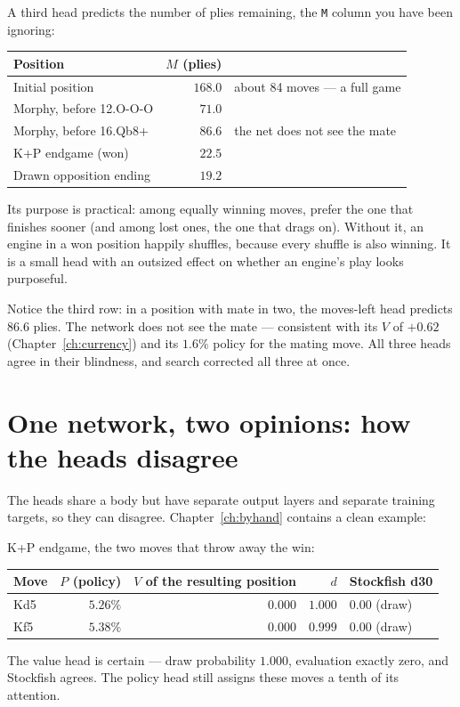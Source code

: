 A third head predicts the number of plies remaining, the \texttt{M} column you have been
ignoring:

\begin{realdata}[title={Real engine output: the moves-left head}]
\begin{center}
\begin{tabular}{@{}lrl@{}}
\toprule
Position & $M$ (plies) & \\
\midrule
Initial position & $168.0$ & about 84 moves --- a full game \\
Morphy, before 12.O-O-O & $71.0$ & \\
Morphy, before 16.Qb8+ & $86.6$ & the net does not see the mate \\
K+P endgame (won) & $22.5$ & \\
Drawn opposition ending & $19.2$ & \\
\bottomrule
\end{tabular}
\end{center}
\end{realdata}

Its purpose is practical: among equally winning moves, prefer the one that finishes sooner
(and among lost ones, the one that drags on). Without it, an engine in a won position happily
shuffles, because every shuffle is also winning. It is a small head with an outsized effect
on whether an engine's play looks purposeful.

Notice the third row: in a position with mate in two, the moves-left head predicts $86.6$
plies. The network does not see the mate --- consistent with its $V$ of $+0.62$
(Chapter~\ref{ch:currency}) and its $1.6\%$ policy for the mating move. All three heads agree
in their blindness, and search corrected all three at once.

\section{One network, two opinions: how the heads disagree}

The heads share a body but have separate output layers and separate training targets, so they
can disagree. Chapter~\ref{ch:byhand} contains a clean example:

\begin{realdata}[title={Real engine output: the value head knows what the policy head does not}]
K+P endgame, the two moves that throw away the win:
\begin{center}
\begin{tabular}{@{}lrrrl@{}}
\toprule
Move & $P$ (policy) & $V$ of the resulting position & $d$ & Stockfish d30 \\
\midrule
Kd5 & $5.26\%$ & $0.000$ & $1.000$ & $0.00$ (draw) \\
Kf5 & $5.38\%$ & $0.000$ & $0.999$ & $0.00$ (draw) \\
\bottomrule
\end{tabular}
\end{center}
The value head is certain --- draw probability $1.000$, evaluation exactly zero, and Stockfish
agrees. The policy head still assigns these moves a tenth of its attention.
\end{realdata}

